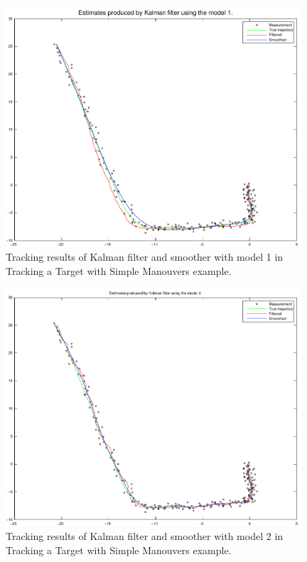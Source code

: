 \begin{figure}
\begin{center}
\includegraphics[width=11cm]{pics/imm1}
\caption{Tracking results of Kalman filter and smoother with model 1
in Tracking a Target with Simple Manouvers example.}
\label{fig:imm_kf1}
\end{center}
\end{figure}

\begin{figure}
\begin{center}
\includegraphics[width=11cm]{pics/imm2}
\caption{Tracking results of Kalman filter and smoother with model 2
in Tracking a Target with Simple Manouvers example.}
\label{fig:imm_kf2}
\end{center}
\end{figure}

